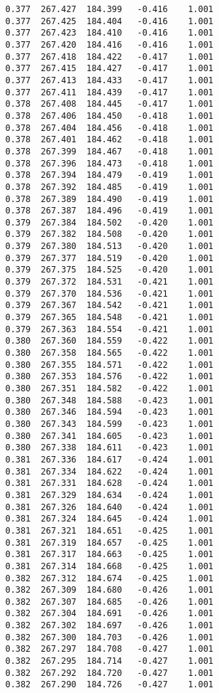 \begin{verbatim}
   0.377  267.427  184.399   -0.416    1.001
   0.377  267.425  184.404   -0.416    1.001
   0.377  267.423  184.410   -0.416    1.001
   0.377  267.420  184.416   -0.416    1.001
   0.377  267.418  184.422   -0.417    1.001
   0.377  267.415  184.427   -0.417    1.001
   0.377  267.413  184.433   -0.417    1.001
   0.377  267.411  184.439   -0.417    1.001
   0.378  267.408  184.445   -0.417    1.001
   0.378  267.406  184.450   -0.418    1.001
   0.378  267.404  184.456   -0.418    1.001
   0.378  267.401  184.462   -0.418    1.001
   0.378  267.399  184.467   -0.418    1.001
   0.378  267.396  184.473   -0.418    1.001
   0.378  267.394  184.479   -0.419    1.001
   0.378  267.392  184.485   -0.419    1.001
   0.378  267.389  184.490   -0.419    1.001
   0.378  267.387  184.496   -0.419    1.001
   0.379  267.384  184.502   -0.420    1.001
   0.379  267.382  184.508   -0.420    1.001
   0.379  267.380  184.513   -0.420    1.001
   0.379  267.377  184.519   -0.420    1.001
   0.379  267.375  184.525   -0.420    1.001
   0.379  267.372  184.531   -0.421    1.001
   0.379  267.370  184.536   -0.421    1.001
   0.379  267.367  184.542   -0.421    1.001
   0.379  267.365  184.548   -0.421    1.001
   0.379  267.363  184.554   -0.421    1.001
   0.380  267.360  184.559   -0.422    1.001
   0.380  267.358  184.565   -0.422    1.001
   0.380  267.355  184.571   -0.422    1.001
   0.380  267.353  184.576   -0.422    1.001
   0.380  267.351  184.582   -0.422    1.001
   0.380  267.348  184.588   -0.423    1.001
   0.380  267.346  184.594   -0.423    1.001
   0.380  267.343  184.599   -0.423    1.001
   0.380  267.341  184.605   -0.423    1.001
   0.380  267.338  184.611   -0.423    1.001
   0.381  267.336  184.617   -0.424    1.001
   0.381  267.334  184.622   -0.424    1.001
   0.381  267.331  184.628   -0.424    1.001
   0.381  267.329  184.634   -0.424    1.001
   0.381  267.326  184.640   -0.424    1.001
   0.381  267.324  184.645   -0.424    1.001
   0.381  267.321  184.651   -0.425    1.001
   0.381  267.319  184.657   -0.425    1.001
   0.381  267.317  184.663   -0.425    1.001
   0.381  267.314  184.668   -0.425    1.001
   0.382  267.312  184.674   -0.425    1.001
   0.382  267.309  184.680   -0.426    1.001
   0.382  267.307  184.685   -0.426    1.001
   0.382  267.304  184.691   -0.426    1.001
   0.382  267.302  184.697   -0.426    1.001
   0.382  267.300  184.703   -0.426    1.001
   0.382  267.297  184.708   -0.427    1.001
   0.382  267.295  184.714   -0.427    1.001
   0.382  267.292  184.720   -0.427    1.001
   0.382  267.290  184.726   -0.427    1.001

\end{verbatim}
